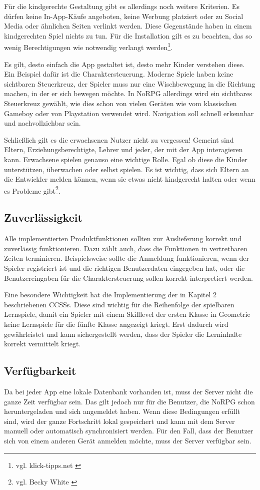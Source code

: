 		Für die kindgerechte Gestaltung gibt es allerdings noch weitere Kriterien. Es dürfen keine In-App-Käufe angeboten, keine Werbung platziert oder zu Social Media oder ähnlichen Seiten verlinkt werden. Diese Gegenstände haben in einem kindgerechten Spiel nichts zu tun. Für die Installation gilt es zu beachten, das so wenig Berechtigungen wie notwendig verlangt werden\footnote{vgl. klick-tipps.net \cite{appsforkids}}.
		
		Es gilt, desto einfach die App gestaltet ist, desto mehr Kinder verstehen diese. Ein Beispiel dafür ist die Charaktersteuerung. Moderne Spiele haben keine sichtbaren Steuerkreuz, der Spieler muss nur eine Wischbewegung in die Richtung machen, in der er sich bewegen möchte. In NoRPG allerdings wird ein sichtbares Steuerkreuz gewählt, wie dies schon von vielen Geräten wie vom klassischen Gameboy oder von Playstation verwendet wird. Navigation soll schnell erkennbar und nachvollziehbar sein.
		
		Schließlich gilt es die erwachsenen Nutzer nicht zu vergessen! Gemeint sind Eltern, Erziehungsberechtigte, Lehrer und jeder, der mit der App interagieren kann. Erwachsene spielen genauso eine wichtige Rolle. Egal ob diese die Kinder unterstützen, überwachen oder selbst spielen. Es ist wichtig, dass sich Eltern an die Entwickler melden können, wenn sie etwas nicht kindgerecht halten oder wenn es Probleme gibt\footnote{vgl. Becky White \cite{smashMagazin}}.	

	\subsection{Zuverlässigkeit}
		Alle implementierten Produktfunktionen sollten zur Auslieferung korrekt und zuverlässig funktionieren. Dazu zählt auch, dass die Funktionen in vertretbaren Zeiten terminieren. Beispielsweise sollte die Anmeldung funktionieren, wenn der Spieler registriert ist und die richtigen Benutzerdaten eingegeben hat, oder die Benutzereingaben für die Charaktersteuerung sollen korrekt interpretiert werden.
		
		Eine besondere Wichtigkeit hat die Implementierung der in Kapitel 2 beschriebenen \acp{CCSS}. Diese sind wichtig für die Reihenfolge der spielbaren Lernspiele, damit ein Spieler mit einem Skilllevel der ersten Klasse in Geometrie keine Lernspiele für die fünfte Klasse angezeigt kriegt. Erst dadurch wird gewährleistet und kann sichergestellt werden, dass der Spieler die Lerninhalte korrekt vermittelt kriegt.
	
	\subsection{Verfügbarkeit}
		Da bei jeder App eine lokale Datenbank vorhanden ist, muss der Server nicht die ganze Zeit verfügbar sein. Das gilt jedoch nur für die Benutzer, die NoRPG schon heruntergeladen und sich angemeldet haben. Wenn diese Bedingungen erfüllt sind, wird der ganze Fortschritt lokal gespeichert und kann mit dem Server manuell oder automatisch synchronisiert werden. Für den Fall, dass der Benutzer sich von einem anderen Gerät anmelden möchte, muss der Server verfügbar sein.
		
